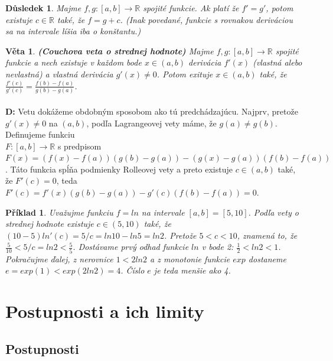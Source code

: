 \documentclass[12pt,a4paper]{article}
\newtheorem{sentence}{Věta}
\newtheorem{example}{Příklad}
\newtheorem{result}{Důsledek}
\begin{document}
\begin{result}
	Majme $f, g:[a, b]\rightarrow \mathds{R}$ spojité funkcie. Ak platí že $f' = g'$, potom existuje $c\in\mathds{R}$ také, že $f=g+c$. (Inak povedané, funkcie s rovnakou deriváciou sa na intervale líšia iba o konštantu.)
\end{result}

\begin{sentence}
	\textbf{(Couchova veta o strednej hodnote)} Majme $f, g:[a, b]\rightarrow \mathds{R}$ spojité funkcie a nech existuje v každom bode $x\in (a, b)$ derivácia $f'(x)$ (vlastná alebo nevlastná) a vlastná derivácia $g'(x)\neq 0$. Potom exituje $x\in (a, b)$ také, že $\frac{f'(c)}{g'(c)}=\frac{f(b)-f(a)}{g(b)-g(a)}$.
\end{sentence}
\paragraph{}
\textbf{D:} Vetu dokážeme obdobným sposobom ako tú predchádzajúcu. Najprv, pretože $g'(x)\neq 0$ na $(a, b)$, podľa Lagrangeovej vety máme, že $g(a)\neq g(b)$. Definujeme funkciu \\ $F:[a, b]\rightarrow \mathds{R}$ s predpisom $F(x)=(f(x)-f(a))(g(b)-g(a))-(g(x)-g(a))(f(b)-f(a))$. Táto funkcia spĺňa podmienky Rolleovej vety a preto existuje $c\in (a, b)$ také, že $F'(c)=0$, teda $F'(c)= f'(x)(g(b)-g(a))-g'(c)(f(b)-f(a))=0$.

\begin{example}
	Uvažujme funkciu $f=ln$ na intervale $[a, b]=[5, 10]$. Podľa vety o strednej hodnote existuje $c\in(5, 10)$ také, že $(10-5)ln'(c)=5/c=ln 10 - ln 5=ln2$. Pretože $5<c<10$, znamená to, že $\frac{5}{10}<5/c=ln2<\frac{5}{5}$. Dostávame prvý odhad funkcie $ln$ v bode 2: $\frac{1}{2}<ln2<1$. Pokračujme ďalej, z nerovnice $1<2ln2$ a z monotonie funkcie $exp$ dostaneme $e=exp(1)<exp(2ln2)=4$. Číslo $e$ je teda menšie ako 4.
\end{example}

\section{Postupnosti a ich limity}
\subsection{Postupnosti}
\end{document}

